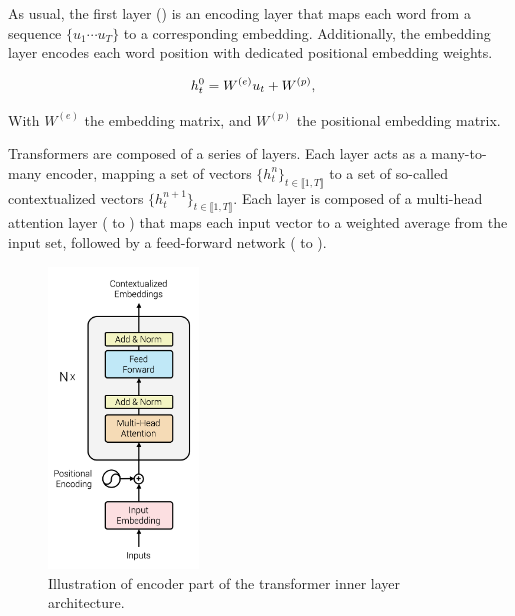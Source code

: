 As usual, the first layer () is an encoding layer that maps each word from a sequence $\{u_1 \cdots u_T\}$ to a corresponding embedding. Additionally, the embedding layer encodes each word position with dedicated positional embedding weights.

\begin{align}
h^0_t &= W^{(e)}u_t + W^{(p)}, \labeq{transformers-emb}
\end{align}

With $W^{(e)}$ the embedding matrix, and $W^{(p)}$ the positional embedding matrix.

Transformers are composed of a series of layers. Each layer acts as a many-to-many encoder, mapping a set of vectors $\{h^n_t\}_{t \in \llbracket 1, T \rrbracket}$ to a set of so-called contextualized vectors $\{h^{n+1}_t\}_{t \in \llbracket 1, T \rrbracket}$. Each layer is composed of a multi-head attention layer ( to ) that maps each input vector to a weighted average from the input set, followed by a feed-forward network ( to ). 


\begin{figure}[!ht]
	\includegraphics[width=4cm]{images/transformer-encoder.png}
	\caption[Transformer layer]{Illustration of encoder part of the transformer inner layer architecture.}
\end{figure}


